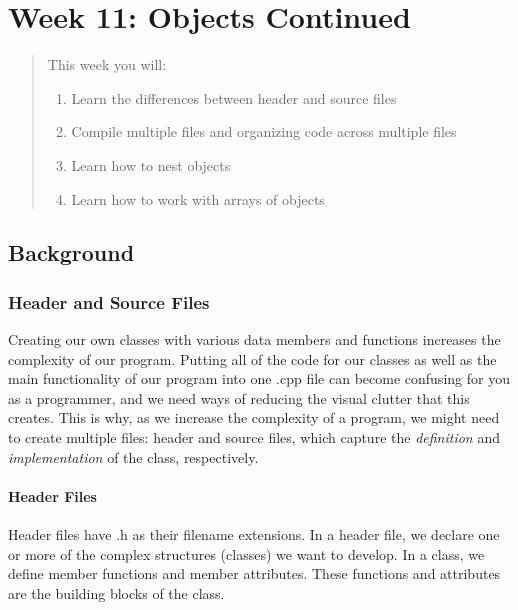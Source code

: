 \chapter*{Week 11: Objects Continued}
\setcounter{chapter}{12}
\setcounter{section}{0}

\begin{abstract}
This week you will:
\begin{enumerate}
    \item Learn the differences between header and source files
    \item Compile multiple files and organizing code across multiple files
    \item Learn how to nest objects
    \item Learn how to work with arrays of objects

\end{enumerate}
    
\end{abstract}

\section{Background}
\subsection{Header and Source Files}
Creating our own classes with various data members and functions increases the complexity of our program. Putting all of the code for our classes as well as the main functionality of our program into one .cpp file can become confusing for you as a programmer, and we need ways of reducing the visual clutter that this creates. This is why, as we increase the complexity of a program, we might need to create multiple files: header and source files, which capture the \textit{definition} and \textit{implementation} of the class, respectively.

\subsubsection{Header Files}

Header files have .h as their filename extensions. In a header file, we declare one or more of the complex structures (classes) we want to develop. In a class, we define member functions and member attributes. These functions and attributes are the building blocks of the class.


